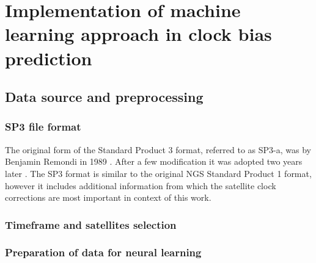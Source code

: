 \FloatBarrier
\chapter{Implementation of machine learning approach in clock bias prediction}


\FloatBarrier
\section{Data source and preprocessing}

\FloatBarrier
\subsection{SP3 file format}
The original form of the Standard Product 3 format, referred to as SP3-a, was by Benjamin Remondi 
in 1989 \cite{Remondi1989}.
After a few modification it was adopted two years later \cite{Remondi1991}. 
The SP3 format is similar to the original NGS Standard Product 1 format, however it includes
additional information from which the satellite clock corrections are most important in context
of this work.

\FloatBarrier
\subsection{Timeframe and satellites selection}

\FloatBarrier
\subsection{Preparation of data for neural learning}
